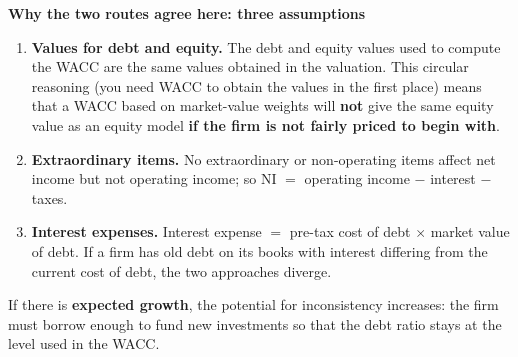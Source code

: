 \textbf{Why the two routes agree here: three assumptions }
\begin{enumerate}
  \item \textbf{Values for debt and equity.} The debt and equity values used to compute the WACC are the same values obtained in the valuation. This circular reasoning (you need WACC to obtain the values in the first place) means that a WACC based on market-value weights will \textbf{not} give the same equity value as an equity model \textbf{if the firm is not fairly priced to begin with}.
  \item \textbf{Extraordinary items.} No extraordinary or non-operating items affect net income but not operating income; so NI $=$ operating income $-$ interest $-$ taxes.
  \item \textbf{Interest expenses.} Interest expense $=$ pre-tax cost of debt $\times$ market value of debt. If a firm has old debt on its books with interest differing from the current cost of debt, the two approaches diverge.
\end{enumerate}
If there is \textbf{expected growth}, the potential for inconsistency increases: the firm must borrow enough to fund new investments so that the debt ratio stays at the level used in the WACC.

